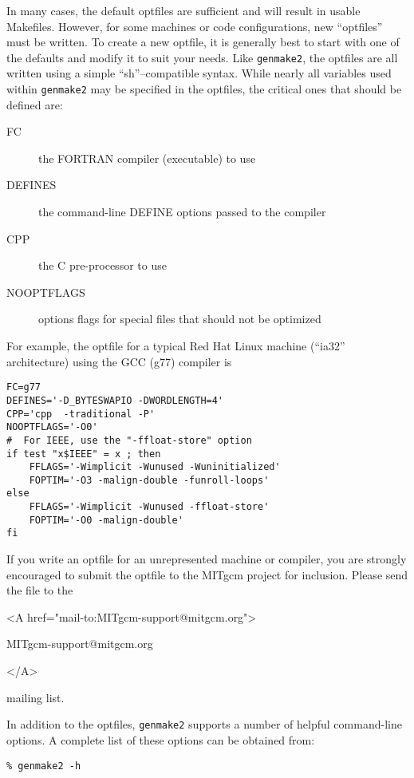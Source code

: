 In many cases, the default optfiles are sufficient and will result in
usable Makefiles.  However, for some machines or code configurations,
new ``optfiles'' must be written. To create a new optfile, it is
generally best to start with one of the defaults and modify it to suit
your needs.  Like \texttt{genmake2}, the optfiles are all written
using a simple ``sh''--compatible syntax.  While nearly all variables
used within \texttt{genmake2} may be specified in the optfiles, the
critical ones that should be defined are:

\begin{description}
\item[FC] the FORTRAN compiler (executable) to use
\item[DEFINES] the command-line DEFINE options passed to the compiler
\item[CPP] the C pre-processor to use
\item[NOOPTFLAGS] options flags for special files that should not be
  optimized
\end{description}

For example, the optfile for a typical Red Hat Linux machine (``ia32''
architecture) using the GCC (g77) compiler is
\begin{verbatim}
FC=g77
DEFINES='-D_BYTESWAPIO -DWORDLENGTH=4'
CPP='cpp  -traditional -P'
NOOPTFLAGS='-O0'
#  For IEEE, use the "-ffloat-store" option
if test "x$IEEE" = x ; then
    FFLAGS='-Wimplicit -Wunused -Wuninitialized'
    FOPTIM='-O3 -malign-double -funroll-loops'
else
    FFLAGS='-Wimplicit -Wunused -ffloat-store'
    FOPTIM='-O0 -malign-double'
fi
\end{verbatim}

If you write an optfile for an unrepresented machine or compiler, you
are strongly encouraged to submit the optfile to the MITgcm project
for inclusion.  Please send the file to the
\begin{rawhtml} <A href="mail-to:MITgcm-support@mitgcm.org"> \end{rawhtml}
\begin{center}
  MITgcm-support@mitgcm.org
\end{center}
\begin{rawhtml} </A> \end{rawhtml}
mailing list.

In addition to the optfiles, \texttt{genmake2} supports a number of
helpful command-line options.  A complete list of these options can be
obtained from:
\begin{verbatim}
% genmake2 -h
\end{verbatim}

